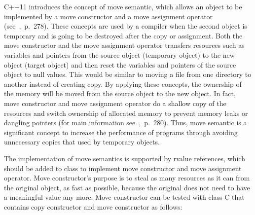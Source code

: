 \documentclass[11pt]{report}
\begin{document}
C++11 introduces the concept of move semantic, which allows an object to be implemented by a move constructor and a move assignment operator (see~\cite{Gregorie:professionalcpp},~p.~278). These concepts are used by a compiler when the second object is temporary and is going to be destroyed after the copy or assignment. Both the move constructor and the move assignment operator transfers resources such as variables and pointers from the source object (temporary object) to the new object (target object) and then reset the variables and pointers of the source object to null values. This would be similar to moving a file from one directory to another instead of creating copy. By applying these concepts, the ownership of the memory will be moved from the source object to the new object. In fact, move constructor and move assignment operator do a shallow copy of the resources and switch ownership of allocated memory to prevent memory leaks or dangling pointers (for main information see~\cite{Gregorie:professionalcpp},~p.~280). Thus, move semantic is a significant concept to increase the performance of programs through avoiding unnecessary copies that used by temporary objects.

The implementation of move semantics is supported by rvalue references, which should be added to class to implement move constructor and move assignment operator. Move constructor's purpose is to steal as many resources as it can from the original object, as fast as possible, because the original does not need to have a meaningful value any more. Move constructor can be tested with class C that contains copy constructor and move constructor as follows:
\end{document}
